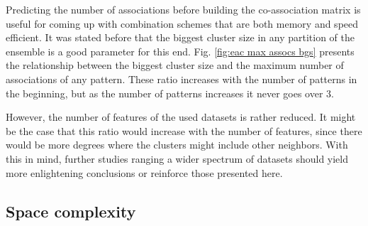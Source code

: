 

Predicting the number of associations before building the co-association matrix is useful for coming up with combination schemes that are both memory and speed efficient.
It was stated before that the biggest cluster size in any partition of the ensemble is a good parameter for this end.
Fig. \ref{fig:eac max assocs bgs} presents the relationship between the biggest cluster size and the maximum number of associations of any pattern.
These ratio increases with the number of patterns in the beginning, but as the number of patterns increases it never goes over 3.


However, the number of features of the used datasets is rather reduced.
It might be the case that this ratio would increase with the number of features, since there would be more degrees where the clusters might include other neighbors.
With this in mind, further studies ranging a wider spectrum of datasets should yield more enlightening conclusions or reinforce those presented here.

\subsection{Space complexity}

